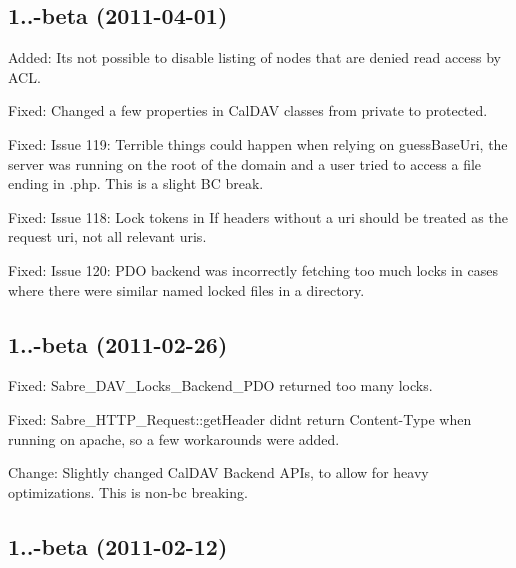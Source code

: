 \subsection*{1..-\/beta (2011-\/04-\/01) }


\begin{DoxyItemize}
\item Added\+: It\textquotesingle{}s not possible to disable listing of nodes that are denied read access by A\+CL.
\item Fixed\+: Changed a few properties in Cal\+D\+AV classes from private to protected.
\item Fixed\+: Issue 119\+: Terrible things could happen when relying on guess\+Base\+Uri, the server was running on the root of the domain and a user tried to access a file ending in .php. This is a slight BC break.
\item Fixed\+: Issue 118\+: Lock tokens in If headers without a uri should be treated as the request uri, not \textquotesingle{}all relevant uri\textquotesingle{}s.
\item Fixed\+: Issue 120\+: P\+DO backend was incorrectly fetching too much locks in cases where there were similar named locked files in a directory.
\end{DoxyItemize}

\subsection*{1..-\/beta (2011-\/02-\/26) }


\begin{DoxyItemize}
\item Fixed\+: Sabre\+\_\+\+D\+A\+V\+\_\+\+Locks\+\_\+\+Backend\+\_\+\+P\+DO returned too many locks.
\item Fixed\+: Sabre\+\_\+\+H\+T\+T\+P\+\_\+\+Request\+::get\+Header didn\textquotesingle{}t return Content-\/\+Type when running on apache, so a few workarounds were added.
\item Change\+: Slightly changed Cal\+D\+AV Backend A\+PI\textquotesingle{}s, to allow for heavy optimizations. This is non-\/bc breaking.
\end{DoxyItemize}

\subsection*{1..-\/beta (2011-\/02-\/12) }



